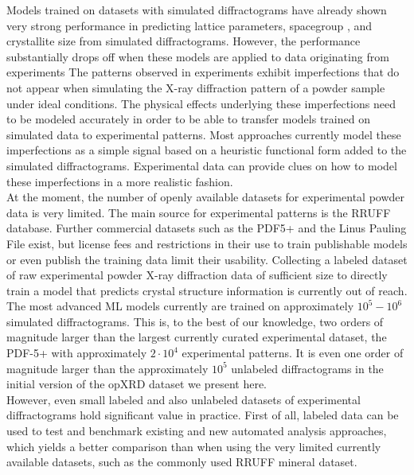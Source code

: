 Models trained on datasets with simulated diffractograms have already shown very strong performance in predicting lattice parameters\cite{Dong2021, Chitturi2021, Habershon2004, zhang2024crystallographic}, spacegroup \cite{cao2024simxrd,Schopmans2023, Oviedo2018, Park2017, Vecsei2018, Zaloga2020, Suzuki2020, Chakraborty2021,zhang2024crystallographic}, and crystallite size \cite{Dong2021, Chakraborty2021} from simulated diffractograms.
However, the performance substantially drops off when these models are applied to data originating from experiments \cite{cao2024simxrd,Schopmans2023,zhang2024crystallographic, Wang2020, Vecsei2018} The patterns observed in experiments exhibit imperfections that do not appear when simulating the X-ray diffraction pattern of a powder sample under ideal conditions. The physical effects underlying these imperfections need to be modeled accurately in order to be able to transfer models trained on simulated data to experimental patterns. Most approaches currently model these imperfections as a simple signal based on a heuristic functional form added to the simulated diffractograms. Experimental data can provide clues on how to model these imperfections in a more realistic fashion. \\

At the moment, the number of openly available datasets for experimental powder data is very limited. The main source for experimental patterns is the RRUFF database\cite{lafuente2015}. Further commercial datasets such as the PDF5+\cite{GatesRector2019} and the Linus Pauling File\cite{villars2018} exist, but license fees and restrictions in their use to train publishable models or even publish the training data limit their usability. Collecting a labeled dataset of raw experimental powder X-ray diffraction data of sufficient size to directly train a model that predicts crystal structure information is currently out of reach. The most advanced ML models currently are trained on approximately $10^5 - 10^6$ simulated diffractograms. \cite{Salgado2023, Schopmans2023} This is, to the best of our knowledge, two orders of magnitude larger than the largest currently curated experimental dataset, the PDF-5+ with approximately $2\cdot 10^4$ experimental patterns. It is even one order of magnitude larger than the approximately $10^5$ unlabeled diffractograms in the initial version of the opXRD dataset we present here.\\

However, even small labeled and also unlabeled datasets of experimental diffractograms hold significant value in practice. First of all, labeled data can be used to test and benchmark existing and new automated analysis approaches, which yields a better comparison than when using the very limited currently available datasets, such as the commonly used RRUFF mineral dataset\cite{Armbruster2015}. \\

